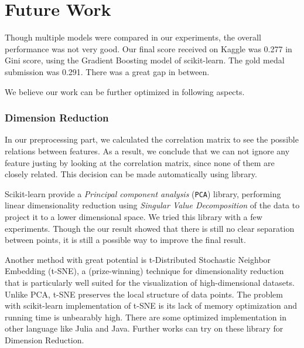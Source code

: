 \documentclass{standalone}
\begin{document}
\section{Future Work}

Though multiple models were compared in our experiments, the overall performance was not very good.
Our final score received on Kaggle was 0.277 in Gini score, using the Gradient Boosting model of scikit-learn. The gold medal submission was 0.291. There was a great gap in between.

We believe our work can be further optimized in following aspects.

\subsubsection{Dimension Reduction}

In our preprocessing part, we calculated the correlation matrix to see the possible relations between features. As a result, we conclude that we can not ignore any feature justing by looking at the correlation matrix, since none of them are closely related. This decision can be made automatically using library.

Scikit-learn provide a \emph{Principal component analysis} (\verb|PCA|) library, performing linear dimensionality reduction using \emph{Singular Value Decomposition} of the data to project it to a lower dimensional space. We tried this library with a few experiments. Though the our result showed that there is still no clear separation between points, it is still a possible way to improve the final result.

Another method with great potential is t-Distributed Stochastic Neighbor Embedding (t-SNE)\cite{van2014accelerating}, a (prize-winning) technique for dimensionality reduction that is particularly well suited for the visualization of high-dimensional datasets\cite{tsne}. Unlike PCA, t-SNE preserves the local structure of data points.
The problem with scikit-learn implementation of t-SNE is its lack of memory optimization and running time is unbearably high. There are some optimized implementation in other language like Julia\cite{tsne:julia} and Java\cite{tsne:java}. Further works can try on these library for Dimension Reduction.
\end{document}
